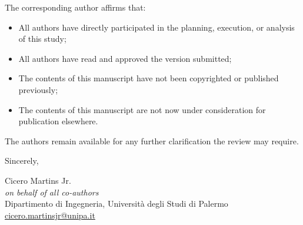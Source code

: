 \documentclass[11pt]{article}
\begin{document}
\vspace{0.3cm}
The corresponding author affirms that:

\begin{itemize}[noitemsep, leftmargin=1.2em]
\item{All authors have directly participated in the planning, execution, or analysis of this study;}
\item{All authors have read and approved the version submitted;}
\item{The contents of this manuscript have not been copyrighted or published previously;}
\item{The contents of this manuscript are not now under consideration for publication elsewhere.}
\end{itemize}

\vspace{0.3cm}

The authors remain available for any further clarification the review may
require.

\vspace{0.5cm}
Sincerely,

\vspace{0.3cm}
Cicero Martins Jr.\\
\textit{on behalf of all co-authors}\\
Dipartimento di Ingegneria, Universit\`a degli Studi di Palermo\\
\href{mailto:cicero.martinsjr@unipa.it}{cicero.martinsjr@unipa.it}
\end{document}
